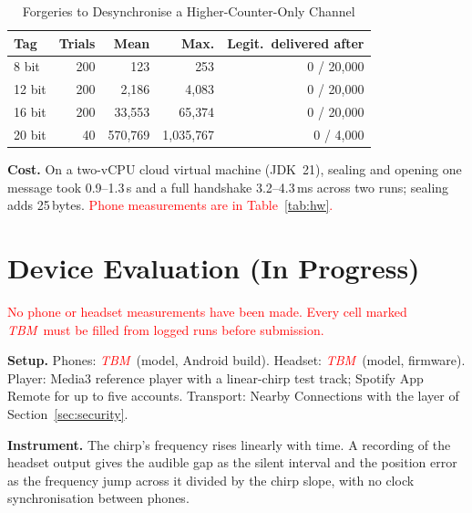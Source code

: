 \documentclass[conference]{IEEEtran}
\newcommand{\tbm}{\textcolor{red}{\textit{TBM}}}
\newcommand{\draftnote}[1]{\textcolor{red}{#1}}
\begin{document}
\begin{table}[t]
\caption{Forgeries to Desynchronise a Higher-Counter-Only Channel}
\label{tab:desync}
\centering
\footnotesize
\begin{tabular}{@{}lrrrr@{}}
\toprule
\textbf{Tag} & \textbf{Trials} & \textbf{Mean} & \textbf{Max.} & \textbf{Legit.\ delivered after} \\
\midrule
8 bit & 200 & 123 & 253 & 0 / 20{,}000 \\
12 bit & 200 & 2{,}186 & 4{,}083 & 0 / 20{,}000 \\
16 bit & 200 & 33{,}553 & 65{,}374 & 0 / 20{,}000 \\
20 bit & 40 & 570{,}769 & 1{,}035{,}767 & 0 / 4{,}000 \\
\bottomrule
\end{tabular}
\end{table}

\textbf{Cost.} On a two-vCPU cloud virtual machine (JDK~21), sealing and opening one message took 0.9--1.3\,\textmu s and a full handshake 3.2--4.3\,ms across two runs; sealing adds 25\,bytes. \draftnote{Phone measurements are in Table~\ref{tab:hw}.}

\section{Device Evaluation (In Progress)}\label{sec:hw}

\draftnote{No phone or headset measurements have been made. Every cell marked \tbm\ must be filled from logged runs before submission.}

\textbf{Setup.} Phones: \tbm\ (model, Android build). Headset: \tbm\ (model, firmware). Player: Media3 reference player with a linear-chirp test track; Spotify App Remote for up to five accounts. Transport: Nearby Connections with the layer of Section~\ref{sec:security}.

\textbf{Instrument.} The chirp's frequency rises linearly with time. A recording of the headset output gives the audible gap as the silent interval and the position error as the frequency jump across it divided by the chirp slope, with no clock synchronisation between phones.
\end{document}
